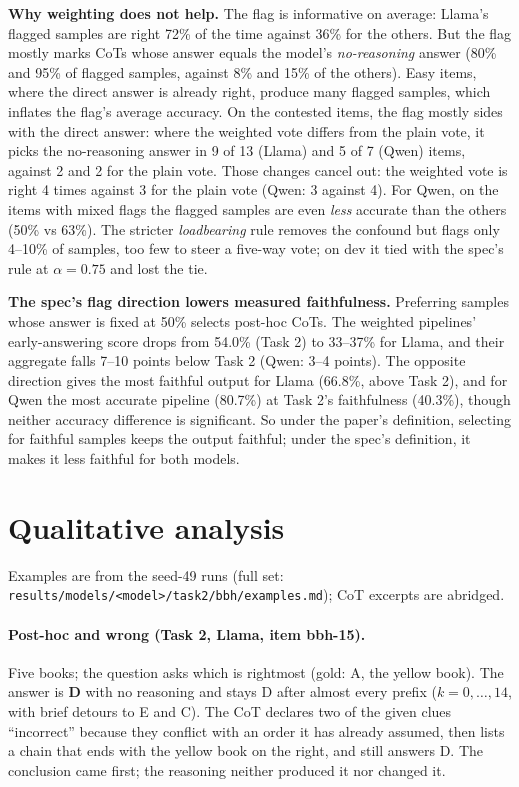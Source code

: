 \documentclass[11pt,a4paper]{article}
\newcommand{\code}[1]{\texttt{\small #1}}
\begin{document}
\noindent\textbf{Why weighting does not help.} The flag is informative on average: Llama's flagged samples are right 72\% of
the time against 36\% for the others. But the flag mostly marks CoTs whose answer equals the model's \emph{no-reasoning}
answer (80\% and 95\% of flagged samples, against 8\% and 15\% of the others). Easy items, where the direct answer is
already right, produce many flagged samples, which inflates the flag's average accuracy. On the contested items, the flag
mostly sides with the direct answer: where the weighted vote differs from the plain vote, it picks the no-reasoning answer
in 9 of 13 (Llama) and 5 of 7 (Qwen) items, against 2 and 2 for the plain vote. Those changes cancel out: the weighted vote
is right 4 times against 3 for the plain vote (Qwen: 3 against 4). For Qwen, on the items with mixed flags the flagged
samples are even \emph{less} accurate than the others (50\% vs 63\%). The stricter \emph{loadbearing} rule removes the
confound but flags only 4--10\% of samples, too few to steer a five-way vote; on dev it tied with the spec's rule at
$\alpha=0.75$ and lost the tie.

\noindent\textbf{The spec's flag direction lowers measured faithfulness.} Preferring samples whose answer is fixed at 50\%
selects post-hoc CoTs. The weighted pipelines' early-answering score drops from 54.0\% (Task 2) to 33--37\% for Llama, and
their aggregate falls 7--10 points below Task 2 (Qwen: 3--4 points). The opposite direction gives the most faithful output
for Llama (66.8\%, above Task 2), and for Qwen the most accurate pipeline (80.7\%) at Task 2's faithfulness (40.3\%), though
neither accuracy difference is significant. So under the paper's definition, selecting for faithful samples keeps the
output faithful; under the spec's definition, it makes it less faithful for both models.

\section{Qualitative analysis}
Examples are from the seed-49 runs (full set: \code{results/models/<model>/task2/bbh/examples.md}); CoT excerpts are
abridged.

\paragraph{Post-hoc and wrong (Task 2, Llama, item bbh-15).} Five books; the question asks which is rightmost (gold: A, the
yellow book). The answer is \textbf{D} with no reasoning and stays D after almost every prefix ($k=0,\dots,14$, with brief
detours to E and C). The CoT declares two of the given clues ``incorrect'' because they conflict with an order it has
already assumed, then lists a chain that ends with the yellow book on the right, and still answers D. The conclusion came
first; the reasoning neither produced it nor changed it.
\end{document}
